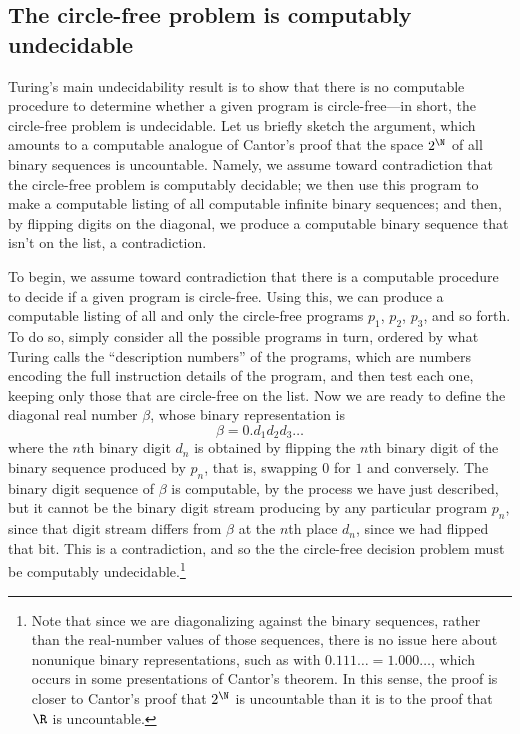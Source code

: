 \documentclass{amsart}
\begin{document}
\subsection{The circle-free problem is computably undecidable}

Turing's main undecidability result is to show that there is no computable procedure to determine whether a given program is circle-free---in short, the circle-free problem is undecidable. Let us briefly sketch the argument, which amounts to a computable analogue of Cantor's proof that the space $2^\N$ of all binary sequences is uncountable. Namely, we assume toward contradiction that the circle-free problem is computably decidable; we then use this program to make a computable listing of all computable infinite binary sequences; and then, by flipping digits on the diagonal, we produce a computable binary sequence that isn't on the list, a contradiction. 

To begin, we assume toward contradiction that there is a computable procedure to decide if a given program is circle-free. Using this, we can produce 
a computable listing of all and only the circle-free programs $p_1$, $p_2$, $p_3$, and so forth. To do so, simply consider all the possible programs in turn, ordered by what Turing calls the ``description numbers'' of the programs, which are numbers encoding the full instruction details of the program, and then test each one, keeping only those that are circle-free on the list. Now we are ready to define the diagonal real number $\beta$, whose binary representation is
  $$\beta=0.d_1d_2d_3\ldots$$
where the $n$th binary digit $d_n$ is obtained by flipping the $n$th binary digit of the binary sequence produced by $p_n$, that is, swapping $0$ for $1$ and conversely. The binary digit sequence of $\beta$ is computable, by the process we have just  described, but it cannot be the binary digit stream producing by any particular program $p_n$, since that digit stream differs from $\beta$ at the $n$th place $d_n$, since we had flipped that bit. This is a contradiction, and so the the circle-free decision problem must be computably undecidable.\footnote{Note that since we are diagonalizing against the binary sequences, rather than the real-number values of those sequences, there is no issue here about nonunique binary representations, such as with $0.111\ldots=1.000\ldots$, which occurs in some presentations of Cantor's theorem. In this sense, the proof is closer to Cantor's proof that $2^\N$ is uncountable than it is to the proof that $\R$ is uncountable.}
\end{document}
